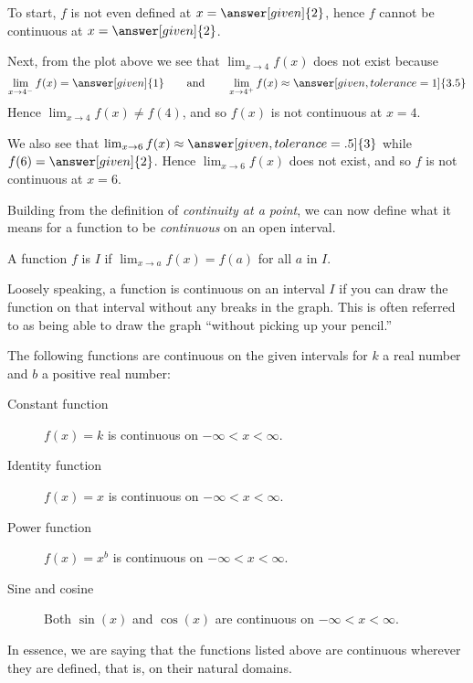 \documentclass{ximera}
\begin{document}
\begin{example}
\begin{explanation}
  To start, $f$ is not even defined at $x=\answer[given]{2}$, hence $f$
  cannot be continuous at $x=\answer[given]{2}$.

  Next, from the plot above we see that $\lim_{x\to 4} f(x)$ does not
  exist because
  \[
  \lim_{x\to 4^-}f(x) = \answer[given]{1}\qquad\text{and}\qquad \lim_{x\to 4^+}f(x) \approx \answer[given,tolerance=1]{3.5}
  \]
Hence $\lim_{x\to 4} f(x) \ne f(4)$, and so $f(x)$ is not
continuous at $x=4$.

We also see that $\lim_{x\to 6} f(x) \approx \answer[given,tolerance=.5]{3}$ while $f(6) =
\answer[given]{2}$. Hence $\lim_{x\to 6} f(x)$ does not exist, and so $f$ is not
continuous at $x=6$.
\end{explanation}
\end{example}


Building from the definition of \textit{continuity at a point}, we can
now define what it means for a function to be \textit{continuous} on
an open interval.

\begin{definition}
  A function $f$ is  $I$ if
  $\lim_{x\to a} f(x) = f(a)$ for all $a$ in $I$.
\end{definition}

Loosely speaking, a function is continuous on an interval $I$ if you
can draw the function on that interval without any breaks in the
graph.  This is often referred to as being able to draw the graph
``without picking up your pencil.''

\begin{theorem}\label{theorem:continuity}
The following functions are continuous on the given intervals for $k$ a real number and $b$ a positive real number:
\begin{description}
\item[Constant function] $f(x) =k$ is continuous on $-\infty < x < \infty$.
\item[Identity function] $f(x) = x$ is continuous on $-\infty < x < \infty$.
\item[Power function] $f(x)=x^b$ is continuous on $-\infty < x < \infty$.
\item[Sine and cosine] Both $\sin(x)$ and $\cos(x)$ are continuous on $-\infty < x < \infty$.
\end{description}
In essence, we are saying that the functions listed above are
continuous wherever they are defined, that is, on their natural
domains.
\end{theorem}
\end{document}

